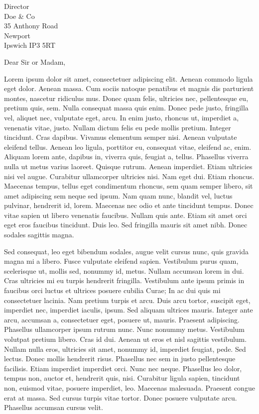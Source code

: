 \documentclass[a4paper]{scrlttr2}
\date{January 21, 1991}
\begin{document}
\begin{letter}{Director \\ Doe \& Co \\ 35 Anthony Road
\\ Newport \\ Ipswich IP3 5RT}


\opening{Dear Sir or Madam,}

Lorem ipsum dolor sit amet, consectetuer adipiscing elit. Aenean commodo ligula eget dolor. Aenean massa. Cum sociis natoque penatibus et magnis dis parturient montes, nascetur ridiculus mus. Donec quam felis, ultricies nec, pellentesque eu, pretium quis, sem. Nulla consequat massa quis enim. Donec pede justo, fringilla vel, aliquet nec, vulputate eget, arcu. In enim justo, rhoncus ut, imperdiet a, venenatis vitae, justo. Nullam dictum felis eu pede mollis pretium. Integer tincidunt. Cras dapibus. Vivamus elementum semper nisi. Aenean vulputate eleifend tellus. Aenean leo ligula, porttitor eu, consequat vitae, eleifend ac, enim. Aliquam lorem ante, dapibus in, viverra quis, feugiat a, tellus. Phasellus viverra nulla ut metus varius laoreet. Quisque rutrum. Aenean imperdiet. Etiam ultricies nisi vel augue. Curabitur ullamcorper ultricies nisi. Nam eget dui. Etiam rhoncus. Maecenas tempus, tellus eget condimentum rhoncus, sem quam semper libero, sit amet adipiscing sem neque sed ipsum. Nam quam nunc, blandit vel, luctus pulvinar, hendrerit id, lorem. Maecenas nec odio et ante tincidunt tempus. Donec vitae sapien ut libero venenatis faucibus. Nullam quis ante. Etiam sit amet orci eget eros faucibus tincidunt. Duis leo. Sed fringilla mauris sit amet nibh. Donec sodales sagittis magna.

 Sed consequat, leo eget bibendum sodales, augue velit cursus nunc, quis gravida magna mi a libero. Fusce vulputate eleifend sapien. Vestibulum purus quam, scelerisque ut, mollis sed, nonummy id, metus. Nullam accumsan lorem in dui. Cras ultricies mi eu turpis hendrerit fringilla. Vestibulum ante ipsum primis in faucibus orci luctus et ultrices posuere cubilia Curae; In ac dui quis mi consectetuer lacinia. Nam pretium turpis et arcu. Duis arcu tortor, suscipit eget, imperdiet nec, imperdiet iaculis, ipsum. Sed aliquam ultrices mauris. Integer ante arcu, accumsan a, consectetuer eget, posuere ut, mauris. Praesent adipiscing. Phasellus ullamcorper ipsum rutrum nunc. Nunc nonummy metus. Vestibulum volutpat pretium libero. Cras id dui. Aenean ut eros et nisl sagittis vestibulum. Nullam nulla eros, ultricies sit amet, nonummy id, imperdiet feugiat, pede. Sed lectus. Donec mollis hendrerit risus. Phasellus nec sem in justo pellentesque facilisis. Etiam imperdiet imperdiet orci. Nunc nec neque. Phasellus leo dolor, tempus non, auctor et, hendrerit quis, nisi. Curabitur ligula sapien, tincidunt non, euismod vitae, posuere imperdiet, leo. Maecenas malesuada. Praesent congue erat at massa. Sed cursus turpis vitae tortor. Donec posuere vulputate arcu. Phasellus accumsan cursus velit.


\end{letter}
\end{document}
